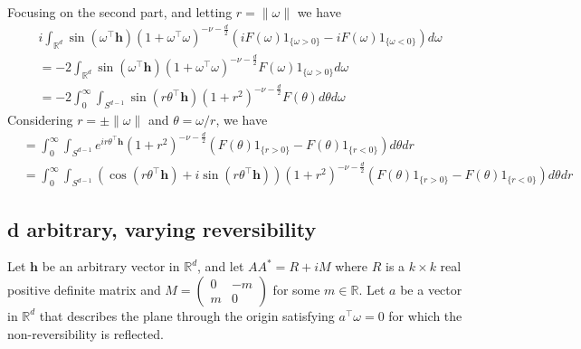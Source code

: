 \documentclass[11pt]{article}
\begin{document}
Focusing on the second part, and letting $r = \left\lVert \omega \right\rVert$ we have \begin{align*}
&i\int_{\mathbb{R}^d}\sin(\omega^\top \boldsymbol{h})(1 + \omega^\top \omega)^{-\nu- \frac{d}{2}} \left(iF(\omega)1_{\{\omega > 0\}}  - iF(\omega)1_{\{\omega < 0\}}\right) d\omega  \\
&= -2\int_{\mathbb{R}^d}\sin(\omega^\top \boldsymbol{h})(1 + \omega^\top \omega)^{-\nu- \frac{d}{2}} F(\omega)1_{\{\omega > 0\}} d\omega \\
&= -2 \int_0^\infty \int_{S^{d-1}}\sin(r\theta^\top \boldsymbol{h})(1 + r^2)^{-\nu- \frac{d}{2}} F(\theta) d\theta d\omega 
 \end{align*}
Considering $r =\pm \left\lVert \omega \right\rVert$ and $\theta = \omega/r$, we have 
\begin{align*}
&=\int_0^\infty \int_{S^{d-1}} e^{i r\theta^\top \boldsymbol{h}}(1 + r^2)^{-\nu- \frac{d}{2}} \left( F(\theta)1_{\{r > 0\}}  - F(\theta)1_{\{r < 0\}}\right) d\theta dr\\
&=\int_0^\infty \int_{S^{d-1}} (\cos(r\theta^\top \boldsymbol{h}) + i\sin(r\theta^\top \boldsymbol{h}))(1 + r^2)^{-\nu- \frac{d}{2}} \left( F(\theta)1_{\{r > 0\}}  - F(\theta)1_{\{r < 0\}}\right) d\theta dr
\end{align*}

\pagebreak

\subsection{d arbitrary, varying reversibility}

Let $ \boldsymbol{h}$ be an arbitrary vector in $\mathbb{R}^d$, and let $AA^* = R + iM$ where $R$ is a $k\times k$ real positive definite matrix and $M = \begin{pmatrix} 0 & -m\\  m & 0\end{pmatrix}$ for some $m \in \mathbb{R}$. Let $a$ be a vector in $\mathbb{R}^d$ that describes the plane through the origin satisfying $a^\top \omega = 0$ for which the non-reversibility is reflected.
\end{document}
